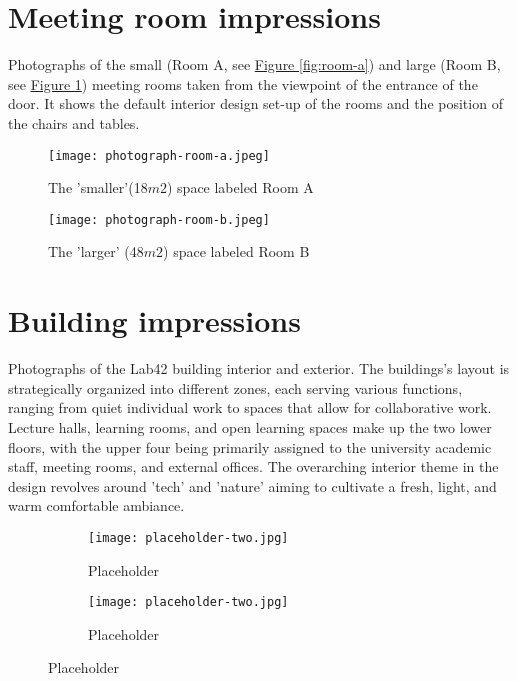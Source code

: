 \begin{appendices}
\section{Meeting room impressions}
\label{appendix:meetings}

Photographs of the small (Room A, see \hyperref[fig:room-a]{Figure \ref{fig:room-a}}) and large (Room B, see \hyperref[fig:room-b]{Figure \ref{fig:room-b}}) meeting rooms taken from the viewpoint of the entrance of the door. It shows the default interior design set-up of the rooms and the position of the chairs and tables.

\begin{figure}[H]
\begin{minipage}{.5\textwidth}
    \centering
    \texttt{[image: photograph-room-a.jpeg]}
    \caption{The 'smaller'(18$m2$) space labeled Room A}
    \label{fig:room-a}
\end{minipage}%
\begin{minipage}{.5\textwidth}
    \centering
    \texttt{[image: photograph-room-b.jpeg]}
    \caption{The 'larger' (48$m2$) space labeled Room B}
    \label{fig:room-b}
\end{minipage}%
\end{figure}

\section{Building impressions}
\label{appendix:building}

Photographs of the Lab42 building interior and exterior. The buildings's layout is strategically organized into different zones, each serving various functions, ranging from quiet individual work to spaces that allow for collaborative work. Lecture halls, learning rooms, and open learning spaces make up the two lower floors, with the upper four being primarily assigned to the university academic staff, meeting rooms, and external offices. The overarching interior theme in the design revolves around 'tech' and 'nature' aiming to cultivate a fresh, light, and warm comfortable ambiance. 

\begin{figure}[htbp]
    \centering
    \begin{subfigure}{0.48\textwidth}
        \centering
        \texttt{[image: placeholder-two.jpg]}
        \caption{Placeholder}
        \label{fig:image1}
    \end{subfigure}
    \hfill
    \begin{subfigure}{0.48\textwidth}
        \centering
        \texttt{[image: placeholder-two.jpg]}
        \caption{Placeholder}
        \label{fig:image2}
    \end{subfigure}
    \caption{Placeholder}
    \label{fig:grid}
\end{figure}


\end{appendices}
